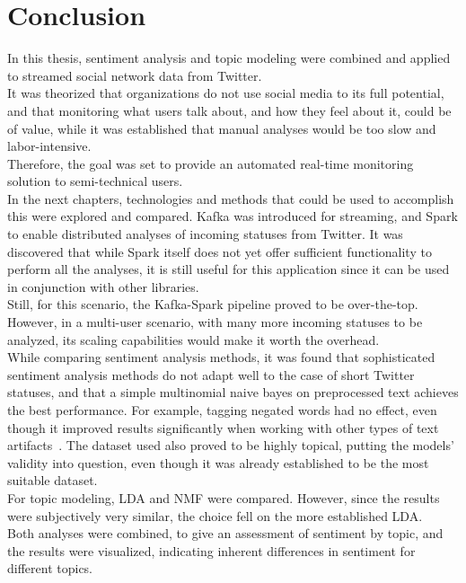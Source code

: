 \chapter{Conclusion}
\label{ch:conclusion}


In this thesis, sentiment analysis and topic modeling were combined and applied to streamed social network data from Twitter.
\\
It was theorized that organizations do not use social media to its full potential,
and that monitoring what users talk about, and how they feel about it,
could be of value,
while it was established that manual analyses would be too slow and labor-intensive.
\\
Therefore, the goal was set to provide an automated real-time monitoring solution to semi-technical users.
\\
In the next chapters, technologies and methods that could be used to accomplish this were explored and compared.
Kafka was introduced for streaming, and Spark to enable distributed analyses of incoming statuses from Twitter.
It was discovered that while Spark itself does not yet offer sufficient functionality to perform all the analyses,
it is still useful for this application since it can be used in conjunction with other libraries.
\\
Still, for this scenario, the Kafka-Spark pipeline proved to be over-the-top.
However, in a multi-user scenario, with many more incoming statuses to be analyzed,
its scaling capabilities would make it worth the overhead.
\\
While comparing sentiment analysis methods, it was found that sophisticated sentiment analysis methods do not adapt well
to the case of short Twitter statuses, and that a simple multinomial naive bayes on preprocessed text achieves the
best performance.
For example, tagging negated words had no effect, even though it improved results significantly when working with
other types of text artifacts~\cite{Hoffmann2005}.
The dataset used also proved to be highly topical, putting the models' validity into question,
even though it was already established to be the most suitable dataset.
\\
For topic modeling, LDA and NMF were compared.
However, since the results were subjectively very similar, the choice fell on the more established LDA.
\\
Both analyses were combined, to give an assessment of sentiment by topic, and the results were visualized,
indicating inherent differences in sentiment for different topics.
